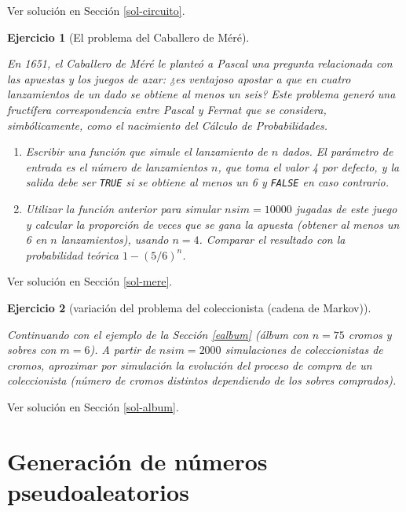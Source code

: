 \documentclass[
]{book}
\theoremstyle{break}
\newtheorem{exercise}{Ejercicio}[chapter]
\theoremstyle{nonumberplain}
\begin{document}
Ver solución en Sección \ref{sol-circuito}.

\begin{exercise}[El problema del Caballero de Méré]
\protect\hypertarget{exr:mere}{}\label{exr:mere}

En 1651, el Caballero de Méré le planteó a Pascal una pregunta
relacionada con las apuestas y los juegos de azar: ¿es ventajoso
apostar a que en cuatro lanzamientos de un dado se obtiene al menos
un seis? Este problema generó una fructífera correspondencia entre
Pascal y Fermat que se considera, simbólicamente, como el nacimiento
del Cálculo de Probabilidades.

\begin{enumerate}
\def\labelenumi{\alph{enumi})}
\item
  Escribir una función que simule el lanzamiento de \(n\) dados. El
  parámetro de entrada es el número de lanzamientos \(n\), que toma
  el valor 4 por defecto, y la salida debe ser \texttt{TRUE} si se
  obtiene al menos un 6 y \texttt{FALSE} en caso contrario.
\item
  Utilizar la función anterior para simular \(nsim=10000\) jugadas
  de este juego y calcular la proporción de veces que se gana la
  apuesta (obtener al menos un 6 en \(n\) lanzamientos), usando
  \(n=4\). Comparar el resultado con la probabilidad teórica
  \(1-(5/6)^{n}\).
\end{enumerate}

\end{exercise}

Ver solución en Sección \ref{sol-mere}.

\begin{exercise}[variación del problema del coleccionista (cadena de Markov)]
\protect\hypertarget{exr:album}{}\label{exr:album}

Continuando con el ejemplo de la Sección \ref{ealbum}
(álbum con \(n = 75\) cromos y sobres con \(m = 6\)). A partir de \(nsim=2000\) simulaciones de coleccionistas de cromos, aproximar por simulación la evolución del proceso de compra de un coleccionista (número de cromos distintos dependiendo de los sobres comprados).
\end{exercise}

Ver solución en Sección \ref{sol-album}.

\hypertarget{gen-pseudo}{%
\chapter{Generación de números pseudoaleatorios}\label{gen-pseudo}}
\end{document}
